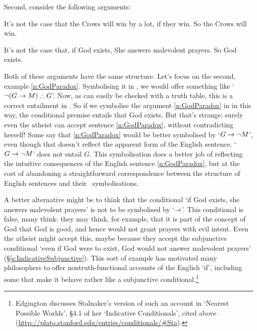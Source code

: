 Second, consider the following arguments:
	\begin{earg}
	\item[\ex{crows}]  It’s not the case that the Crows will win by a lot, if they win.
So the Crows will win.
		\item[\ex{n:GodParadox}] It's not the case that, if God exists, She answers malevolent prayers. So God exists.
	\end{earg}
Both of these arguments have the same structure. Let's focus on the second, example \ref{n:GodParadox}. Symbolising it in \TFL, we would offer something like `$\neg (G \rightarrow M) \mathrel{\therefore} G$'. Now, as can easily be checked with a truth table, this is a correct entailment in \TFL. So if we symbolise the argument \ref{n:GodParadox} in \TFL in this way, the conditional premise entails that God exists. But that's strange: surely even the atheist can accept sentence \ref{n:GodParadox}, without contradicting herself! Some say that \ref{n:GodParadox} would be better symbolised by `$G \rightarrow \neg M$', even though that doesn't reflect the apparent form of the English sentence. `$G \rightarrow \neg M$' does not entail $G$. This symbolisation does a better job of reflecting the intuitive consequences of the English sentence \ref{n:GodParadox}, but at the cost of abandoning a straightforward correspondence between the structure of English sentences and their \TFL\ symbolisations. 

A better alternative might be to think that the conditional `if God exists, she answers malevolent prayers' is not to be symbolised by `$\rightarrow$'. This conditional is false, many think: they may think, for example, that it is part of the concept of God that God is good, and hence would not grant prayers with evil intent. Even the atheist might accept this, maybe because they accept the subjunctive conditional `even if God were to exist, God would not answer malevolent prayers' (§\ref{s:IndicativeSubjunctive}). This sort of example has motivated many philosophers to offer nontruth-functional accounts of the English `if', including some that make it behave rather like a subjunctive conditional.\footnote{Edgington discusses Stalnaker's version of such an account in `Nearest Possible Worlds', §4.1 of her `Indicative Conditionals', cited above (\url{http://plato.stanford.edu/entries/conditionals/\#Sta}).} 

